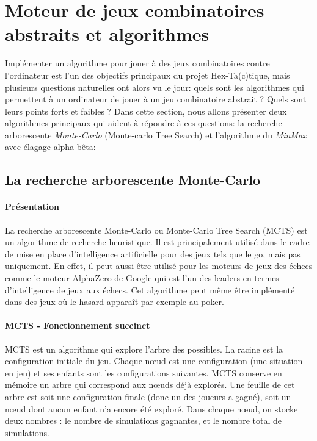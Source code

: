 \section{Moteur de jeux combinatoires abstraits et algorithmes}





Implémenter un algorithme pour jouer à des jeux combinatoires contre l'ordinateur est l'un des objectifs principaux du projet
Hex-Ta(c)tique, mais plusieurs questions naturelles ont alors vu le jour: quels sont les algorithmes qui permettent à un ordinateur
de jouer à un jeu combinatoire abstrait ? Quels sont leurs points forts et faibles ? Dans cette section, nous allons
présenter deux algorithmes principaux qui aident à répondre à ces questions: la recherche arborescente \emph{Monte-Carlo} (Monte-carlo Tree Search) 
et l'algorithme du \emph{MinMax} avec élagage alpha-bêta:

\subsection{La recherche arborescente Monte-Carlo}

\paragraph{Présentation}
La recherche arborescente Monte-Carlo ou Monte-Carlo Tree Search (MCTS) est un algorithme de recherche heuristique.
Il est principalement utilisé dans le cadre de mise en place d'intelligence artificielle pour des jeux tels que le go, mais pas uniquement.
En effet, il peut aussi être utilisé pour les moteurs de jeux des échecs comme le moteur AlphaZero de Google qui est
l'un des leaders en termes d'intelligence de jeux aux échecs. Cet algorithme peut même être implémenté dans des jeux où le hasard 
apparaît par exemple au poker.

\paragraph{MCTS - Fonctionnement succinct}
MCTS est un algorithme qui explore l'arbre des possibles. La racine est la configuration initiale du jeu.
Chaque nœud est une configuration (une situation en jeu) et ses enfants sont les configurations suivantes. MCTS conserve en mémoire 
un arbre qui correspond aux nœuds déjà explorés. Une feuille de cet arbre est soit une configuration finale (donc un des joueurs a gagné),
soit un nœud dont aucun enfant n'a encore été exploré. Dans chaque nœud, on stocke deux nombres : le nombre de simulations gagnantes, 
et le nombre total de simulations. 

